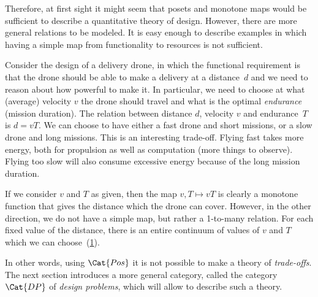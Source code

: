 Therefore, at first sight it might seem that posets and monotone maps
would be sufficient to describe a quantitative theory of design.
However, there are more general relations to be modeled. It is easy enough
to describe examples in which having a simple map from functionality
to resources is not sufficient.

\begin{example}
Consider the design of a delivery drone, in which the functional
requirement is that the drone should be able to make a delivery
at a distance~$d$ and we need to reason about how powerful to make
it. In particular, we need to choose at what (average) velocity $v$ the drone  should travel and what is the optimal \emph{endurance} (mission duration). The relation between distance $d$, velocity $v$ and endurance~$T$ is $d=vT$. We can choose
to have either a fast drone and short missions, or a slow drone
and long missions. This is an interesting trade-off. Flying fast takes more energy, both for propulsion as well as computation (more things to observe). Flying too slow will also consume excessive energy because of the long mission duration.

If we consider $v$ and $T$ as given, then the map $v,T \mapsto vT$ is clearly a monotone function that gives the distance which the drone can cover. However, in the other direction, we do not have a simple map, but rather a 1-to-many relation. For each fixed value of the distance, there is an entire continuum of values of $v$ and $T$ which we can choose~(\cref{fig:drone-example-antichain}).

\begin{figure}[h!]
    \centering
    \caption{\label{fig:drone-example}
    \label{fig:drone-example-antichain}}
\end{figure}

\end{example}

In other words, using $\Cat{Pos}$ it is not possible to make a theory of \emph{trade-offs}. The
next section introduces a more general category, called  the category $\Cat{DP}$ of
\emph{design problems}, which will allow to describe such a theory.
    
